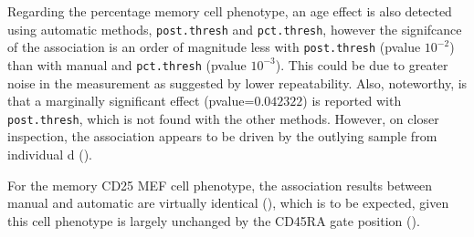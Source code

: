 Regarding the percentage memory cell phenotype,
an age effect is also detected using automatic methods, \texttt{post.thresh} and \texttt{pct.thresh}, however the signifcance of the association 
is an order of magnitude less with \texttt{post.thresh} (pvalue $10^{-2}$) than with manual and \texttt{pct.thresh} (pvalue $10^{-3}$).
This could be due to greater noise in the measurement as suggested by lower repeatability.
Also, noteworthy, is that a marginally significant  effect (pvalue=$0.042322$) is reported with \texttt{post.thresh}, which is not found with the
other methods.  
However, on closer inspection, the association appears to be driven by the outlying sample from individual d ().

For the memory CD25 MEF cell phenotype, the association results between manual and automatic are virtually identical (),
which is to be expected, given this cell phenotype is largely unchanged by the CD45RA gate position ().




